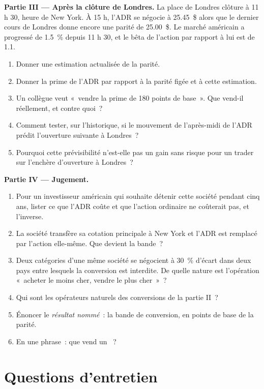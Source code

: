 \begin{problem}
\medskip\noindent\textbf{Partie III --- Après la clôture de Londres.}
La place de Londres clôture à 11 h 30, heure de New York. À 15 h, l'ADR se négocie à 25.45~\$
alors que le dernier cours de Londres donne encore une parité de 25.00~\$. Le marché américain
a progressé de 1.5~\% depuis 11 h 30, et le bêta de l'action par rapport à lui est de 1.1.
\begin{enumerate}[resume]
\item Donner une estimation actualisée de la parité.
\item Donner la prime de l'ADR par rapport à la parité figée et à cette estimation.
\item Un collègue veut «~vendre la prime de 180 points de base~». Que vend-il
réellement, et contre quoi~?
\item Comment tester, sur l'historique, si le mouvement de l'après-midi de l'ADR
prédit l'ouverture suivante à Londres~?
\item Pourquoi cette prévisibilité n'est-elle pas un gain sans risque pour un trader
sur l'enchère d'ouverture à Londres~?
\end{enumerate}

\medskip\noindent\textbf{Partie IV --- Jugement.}
\begin{enumerate}[resume]
\item Pour un investisseur américain qui souhaite détenir cette société pendant cinq ans, lister
ce que l'ADR coûte et que l'action ordinaire ne coûterait pas, et l'inverse.
\item La société transfère sa cotation principale à New York et l'ADR est
remplacé par l'action elle-même. Que devient la bande~?
\item Deux catégories d'une même société se négocient à 30~\% d'écart dans deux pays
entre lesquels la conversion est interdite. De quelle nature est l'opération «~acheter le
moins cher, vendre le plus cher~»~?
\item Qui sont les opérateurs naturels des conversions de la partie II~?
\item Énoncer le \emph{résultat nommé}~: la bande de conversion, en points de base de
la parité.
\item En une phrase~: que vend un ~?
\end{enumerate}
\end{problem}

\section{Questions d'entretien}

